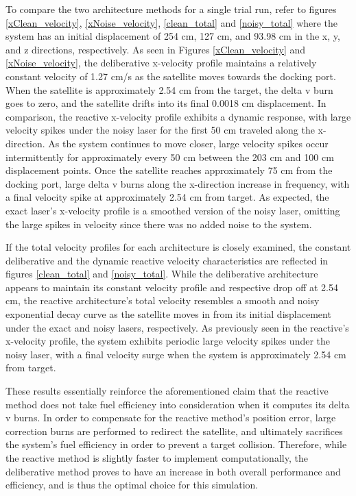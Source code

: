 \documentclass[journal, 10pt]{IEEEtran}
\begin{document}
To compare the two architecture methods for a single trial run, refer to figures \ref{xClean_velocity}, \ref{xNoise_velocity}, \ref{clean_total} and \ref{noisy_total} where the system has an initial displacement of 254 cm, 127 cm, and 93.98 cm in the x, y, and z directions, respectively. As seen in Figures \ref{xClean_velocity} and \ref{xNoise_velocity}, the deliberative x-velocity profile maintains a relatively constant velocity of 1.27 cm/s as the satellite moves towards the docking port. When the satellite is approximately 2.54 cm from the target, the delta v burn goes to zero, and the satellite drifts into its final 0.0018 cm displacement. In comparison, the reactive x-velocity profile exhibits a dynamic response, with large velocity spikes under the noisy laser for the first 50 cm traveled along the x-direction. As the system continues to move closer, large velocity spikes occur intermittently for approximately every 50 cm between the 203 cm and 100 cm displacement points. Once the satellite reaches approximately 75 cm from the docking port, large delta v burns along the x-direction increase in frequency, with a final velocity spike at approximately 2.54 cm from target. As expected, the exact laser's x-velocity profile is a smoothed version of the noisy laser, omitting the large spikes in velocity since there was no added noise to the system. 

If the total velocity profiles for each architecture is closely examined, the constant deliberative and the dynamic reactive velocity characteristics are reflected in figures \ref{clean_total} and \ref{noisy_total}. While the deliberative architecture appears to maintain its constant velocity profile and respective drop off at 2.54 cm, the reactive architecture's total velocity resembles a smooth and noisy exponential decay curve as the satellite moves in from its initial displacement under the exact and noisy lasers, respectively. As previously seen in the reactive's x-velocity profile, the system exhibits periodic large velocity spikes under the noisy laser, with a final velocity surge when the system is approximately 2.54 cm from target. 

These results essentially reinforce the aforementioned claim that the reactive method does not take fuel efficiency into consideration when it computes its delta v burns. In order to compensate for the reactive method's position error, large correction burns are performed to redirect the satellite, and ultimately sacrifices the system's fuel efficiency in order to prevent a target collision. Therefore, while the reactive method is slightly faster to implement computationally, the deliberative method proves to have an increase in both overall performance and efficiency, and is thus the optimal choice for this simulation. 
\end{document}

